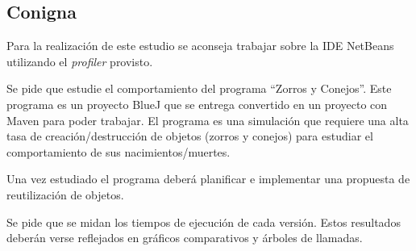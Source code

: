 \subsection*{Conigna}

Para la realización de este estudio se aconseja trabajar sobre la IDE
NetBeans utilizando el \emph{profiler} provisto.

Se pide que estudie el comportamiento del programa “Zorros y Conejos”.
Este programa es un proyecto BlueJ que se entrega convertido en un
proyecto con Maven para poder trabajar. El programa es una simulación
que requiere una alta tasa de creación/destrucción de objetos (zorros
y conejos) para estudiar el comportamiento de sus nacimientos/muertes.

Una vez estudiado el programa deberá planificar e implementar una
propuesta de reutilización de objetos.

Se pide que se midan los tiempos de ejecución de cada versión. Estos
resultados deberán verse reflejados en gráficos comparativos y árboles
de llamadas.

